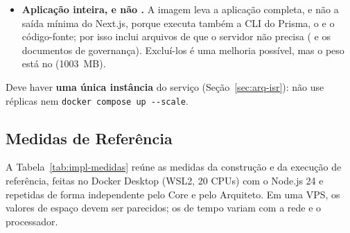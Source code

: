 \begin{itemize}
  \item \textbf{Aplicação inteira, e não .} A imagem leva a aplicação completa, e não a saída mínima do Next.js, porque executa também a CLI do Prisma, o  e o código-fonte; por isso inclui arquivos de que o servidor não precisa ( e os documentos de governança). Excluí-los é uma melhoria possível, mas o peso está no  (1003~MB).
\end{itemize}




Deve haver \textbf{uma única instância} do serviço (Seção~\ref{sec:arq-isr}): não use réplicas nem \texttt{docker compose up -{}-scale}.

\subsection{Medidas de Referência}\label{sec:impl-medidas}

A Tabela~\ref{tab:impl-medidas} reúne as medidas da construção e da execução de referência, feitas no Docker Desktop (WSL2, 20 CPUs) com o Node.js 24 e repetidas de forma independente pelo Core e pelo Arquiteto. Em uma VPS, os valores de espaço devem ser parecidos; os de tempo variam com a rede e o processador.

